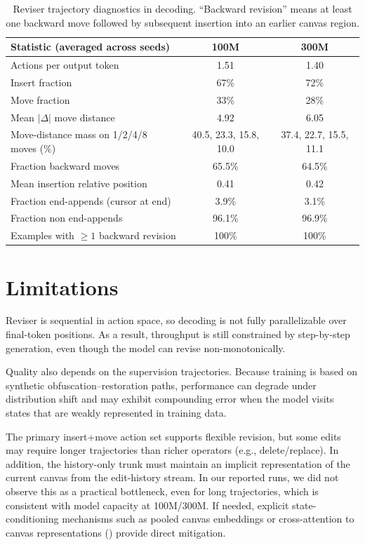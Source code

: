 \documentclass[11pt]{article}
\begin{document}
\begin{table}[tbp]
\centering
\small
\setlength{\tabcolsep}{6pt}
\begin{tabular}{lcc}
\toprule
Statistic (averaged across seeds) & 100M & 300M \\
\midrule
Actions per output token & \num{1.51} & \num{1.40} \\
Insert fraction & 67\% & 72\% \\
Move fraction & 33\% & 28\% \\
Mean $|\Delta|$ move distance & \num{4.92} & \num{6.05} \\
Move-distance mass on 1/2/4/8 moves (\%) & 40.5, 23.3, 15.8, 10.0 & 37.4, 22.7, 15.5, 11.1 \\
Fraction backward moves & \num{65.5}\% & \num{64.5}\% \\
Mean insertion relative position & \num{0.41} & \num{0.42} \\
Fraction end-appends (cursor at end) & \num{3.9}\% & \num{3.1}\% \\
Fraction non end-appends & \num{96.1}\% & \num{96.9}\% \\
Examples with $\geq 1$ backward revision & 100\% & 100\% \\
\bottomrule
\end{tabular}
\caption{Reviser trajectory diagnostics in decoding. ``Backward revision'' means at least one backward move followed by subsequent insertion into an earlier canvas region.}
\label{tab:trajectory_stats}
\end{table}
\section{Limitations}
\label{sec:limitations}
Reviser is sequential in action space, so decoding is not fully parallelizable over final-token positions. As a result, throughput is still constrained by step-by-step generation, even though the model can revise non-monotonically.

Quality also depends on the supervision trajectories. Because training is based on synthetic obfuscation--restoration paths, performance can degrade under distribution shift and may exhibit compounding error when the model visits states that are weakly represented in training data.

The primary insert+move action set supports flexible revision, but some edits may require longer trajectories than richer operators (e.g., delete/replace). In addition, the history-only trunk must maintain an implicit representation of the current canvas from the edit-history stream. In our reported runs, we did not observe this as a practical bottleneck, even for long trajectories, which is consistent with model capacity at 100M/300M. If needed, explicit state-conditioning mechanisms such as pooled canvas embeddings or cross-attention to canvas representations () provide direct mitigation.
\end{document}
